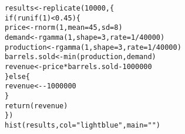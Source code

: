 \documentclass{beamer}\usepackage[]{graphicx}\usepackage[]{color}
\makeatletter
\newcommand{\hlnum}[1]{\textcolor[rgb]{0.824,0.412,0.118}{#1}}%
\newcommand{\hlstr}[1]{\textcolor[rgb]{1,0.894,0.71}{#1}}%
\newcommand{\hlopt}[1]{\textcolor[rgb]{1,0.894,0.769}{#1}}%
\newcommand{\hlstd}[1]{\textcolor[rgb]{1,0.894,0.769}{#1}}%
\newcommand{\hlkwa}[1]{\textcolor[rgb]{0.941,0.902,0.549}{#1}}%
\newcommand{\hlkwb}[1]{\textcolor[rgb]{0.804,0.776,0.451}{#1}}%
\newcommand{\hlkwc}[1]{\textcolor[rgb]{0.78,0.941,0.545}{#1}}%
\newcommand{\hlkwd}[1]{\textcolor[rgb]{1,0.78,0.769}{#1}}%
\newenvironment{kframe}{%
 \def\at@end@of@kframe{}%
 \ifinner\ifhmode%
  \def\at@end@of@kframe{\end{minipage}}%
  \begin{minipage}{\columnwidth}%
 \fi\fi%
 \def\FrameCommand##1{\hskip\@totalleftmargin \hskip-\fboxsep
 \colorbox{shadecolor}{##1}\hskip-\fboxsep
     \hskip-\linewidth \hskip-\@totalleftmargin \hskip\columnwidth}%
 \MakeFramed {\advance\hsize-\width
   \@totalleftmargin\z@ \linewidth\hsize
   \@setminipage}}%
 {\par\unskip\endMakeFramed%
 \at@end@of@kframe}
\newenvironment{knitrout}{}{} %
\makeatother
\begin{document}
\begin{darkframes}
    \begin{frame}[fragile]
      \fontvsm
\begin{knitrout}
\begin{kframe}
\begin{alltt}
\hlstd{results} \hlkwb{<-} \hlkwd{replicate}\hlstd{(}\hlnum{10000}\hlstd{, \{}
  \hlkwa{if} \hlstd{(}\hlkwd{runif}\hlstd{(}\hlnum{1}\hlstd{)} \hlopt{<} \hlnum{0.45}\hlstd{) \{}
    \hlstd{price} \hlkwb{<-} \hlkwd{rnorm}\hlstd{(}\hlnum{1}\hlstd{,} \hlkwc{mean}\hlstd{=}\hlnum{45}\hlstd{,} \hlkwc{sd}\hlstd{=}\hlnum{8}\hlstd{)}
    \hlstd{demand} \hlkwb{<-} \hlkwd{rgamma}\hlstd{(}\hlnum{1}\hlstd{,} \hlkwc{shape}\hlstd{=}\hlnum{3}\hlstd{,} \hlkwc{rate}\hlstd{=}\hlnum{1}\hlopt{/}\hlnum{40000}\hlstd{)}
    \hlstd{production} \hlkwb{<-} \hlkwd{rgamma}\hlstd{(}\hlnum{1}\hlstd{,} \hlkwc{shape}\hlstd{=}\hlnum{3}\hlstd{,} \hlkwc{rate}\hlstd{=}\hlnum{1}\hlopt{/}\hlnum{40000}\hlstd{)}
    \hlstd{barrels.sold} \hlkwb{<-} \hlkwd{min}\hlstd{(production, demand)}
    \hlstd{revenue} \hlkwb{<-} \hlstd{price} \hlopt{*} \hlstd{barrels.sold} \hlopt{-} \hlnum{1000000}
  \hlstd{\}} \hlkwa{else} \hlstd{\{}
    \hlstd{revenue} \hlkwb{<-} \hlopt{-}\hlnum{1000000}
  \hlstd{\}}
  \hlkwd{return}\hlstd{(revenue)}
\hlstd{\})}
\hlkwd{hist}\hlstd{(results,} \hlkwc{col}\hlstd{=}\hlstr{"lightblue"}\hlstd{,} \hlkwc{main}\hlstd{=}\hlstr{""}\hlstd{)}
\end{alltt}
\end{kframe}


\end{knitrout}
    \end{frame}
  \end{darkframes}
\end{document}
